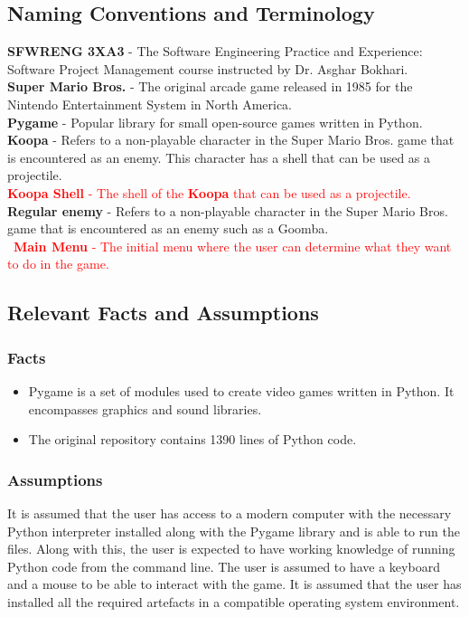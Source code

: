 \documentclass[12pt, titlepage]{article}
\begin{document}
\subsection{Naming Conventions and Terminology}
    \textbf{SFWRENG 3XA3} - The Software Engineering Practice and Experience: Software Project Management course instructed by Dr. Asghar Bokhari.\\
    \textbf{Super Mario Bros.} - The original arcade game released in 1985 for the Nintendo Entertainment System in North America.\\
    \textbf{Pygame} - Popular library for small open-source games written in Python.\\
    \textbf{Koopa} - Refers to a non-playable character in the Super Mario Bros. game that is encountered as an enemy. This character has a shell that can be used as a projectile.\\
    \textcolor{red}{\textbf{Koopa Shell} - The shell of the \textbf{Koopa} that can be used as a projectile.}\\
    \textbf{Regular enemy} - Refers to a non-playable character in the Super Mario Bros. game that is encountered as an enemy such as a Goomba.\\\
    \textcolor{red}{\textbf{Main Menu} - The initial menu where the user can determine what they want to do in the game.}\\
\subsection{Relevant Facts and Assumptions}
    \subsubsection{Facts}
    \begin{itemize}
        \item Pygame is a set of modules used to create video games written in Python. It encompasses graphics and sound libraries.
        \item The original repository contains 1390 lines of Python code.
    \end{itemize}
    \subsubsection{Assumptions}
    It is assumed that the user has access to a modern computer with the necessary Python interpreter installed along with the Pygame library and is able to run the files. Along with this, the user is expected to have working knowledge of running Python code from the command line. The user is assumed to have a keyboard and a mouse to be able to interact with the game. It is assumed that the user has installed all the required artefacts in a compatible operating system environment.
\end{document}
